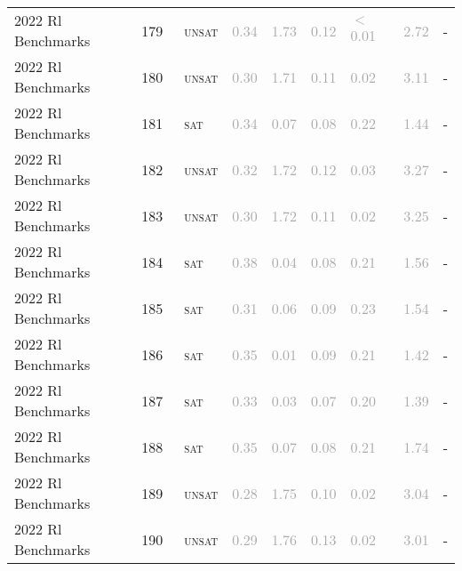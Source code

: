 \begin{center}
{\begin{longtable}{@{}lllllllll@{}}
2022 Rl Benchmarks & 179 & ~\textsc{unsat} & \textcolor{darkgray}{0.34} & \textcolor{darkgray}{1.73} & \textcolor{darkgray}{0.12} & \textcolor{darkgray}{$<$0.01} & \textcolor{darkgray}{2.72} & - \\
2022 Rl Benchmarks & 180 & ~\textsc{unsat} & \textcolor{darkgray}{0.30} & \textcolor{darkgray}{1.71} & \textcolor{darkgray}{0.11} & \textcolor{darkgray}{0.02} & \textcolor{darkgray}{3.11} & - \\
2022 Rl Benchmarks & 181 & ~\textsc{sat} & \textcolor{darkgray}{0.34} & \textcolor{darkgray}{0.07} & \textcolor{darkgray}{0.08} & \textcolor{darkgray}{0.22} & \textcolor{darkgray}{1.44} & - \\
2022 Rl Benchmarks & 182 & ~\textsc{unsat} & \textcolor{darkgray}{0.32} & \textcolor{darkgray}{1.72} & \textcolor{darkgray}{0.12} & \textcolor{darkgray}{0.03} & \textcolor{darkgray}{3.27} & - \\
2022 Rl Benchmarks & 183 & ~\textsc{unsat} & \textcolor{darkgray}{0.30} & \textcolor{darkgray}{1.72} & \textcolor{darkgray}{0.11} & \textcolor{darkgray}{0.02} & \textcolor{darkgray}{3.25} & - \\
2022 Rl Benchmarks & 184 & ~\textsc{sat} & \textcolor{darkgray}{0.38} & \textcolor{darkgray}{0.04} & \textcolor{darkgray}{0.08} & \textcolor{darkgray}{0.21} & \textcolor{darkgray}{1.56} & - \\
2022 Rl Benchmarks & 185 & ~\textsc{sat} & \textcolor{darkgray}{0.31} & \textcolor{darkgray}{0.06} & \textcolor{darkgray}{0.09} & \textcolor{darkgray}{0.23} & \textcolor{darkgray}{1.54} & - \\
2022 Rl Benchmarks & 186 & ~\textsc{sat} & \textcolor{darkgray}{0.35} & \textcolor{darkgray}{0.01} & \textcolor{darkgray}{0.09} & \textcolor{darkgray}{0.21} & \textcolor{darkgray}{1.42} & - \\
2022 Rl Benchmarks & 187 & ~\textsc{sat} & \textcolor{darkgray}{0.33} & \textcolor{darkgray}{0.03} & \textcolor{darkgray}{0.07} & \textcolor{darkgray}{0.20} & \textcolor{darkgray}{1.39} & - \\
2022 Rl Benchmarks & 188 & ~\textsc{sat} & \textcolor{darkgray}{0.35} & \textcolor{darkgray}{0.07} & \textcolor{darkgray}{0.08} & \textcolor{darkgray}{0.21} & \textcolor{darkgray}{1.74} & - \\
2022 Rl Benchmarks & 189 & ~\textsc{unsat} & \textcolor{darkgray}{0.28} & \textcolor{darkgray}{1.75} & \textcolor{darkgray}{0.10} & \textcolor{darkgray}{0.02} & \textcolor{darkgray}{3.04} & - \\
2022 Rl Benchmarks & 190 & ~\textsc{unsat} & \textcolor{darkgray}{0.29} & \textcolor{darkgray}{1.76} & \textcolor{darkgray}{0.13} & \textcolor{darkgray}{0.02} & \textcolor{darkgray}{3.01} & - \\

\end{longtable}}
\end{center}
